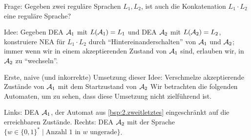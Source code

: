 Frage: Gegeben zwei reguläre Sprachen $L_1, L_2$, ist auch die Konkatenation $L_1\cdot L_2$ eine reguläre Sprache?

Idee: Gegeben \acs*{DEA} $\mathcal{A}_1$ mit $L(\mathcal{A}_1)=L_1$ und \acs*{DEA} $\mathcal{A}_2$ mit $L(\mathcal{A}_2)=L_2$,
konstruiere \acs*{NEA} für $L_1\cdot L_2$ durch "`Hintereinanderschalten"' von $\mathcal{A}_1$ und $\mathcal{A}_2$;
immer wenn wir in einem akzeptierenden Zustand von $\mathcal{A}_1$ sind, erlauben wir, in $\mathcal{A}_2$ zu "`wechseln"'.

Erste, naive (und inkorrekte) Umsetzung dieser Idee: 
Verschmelze akzeptierende Zustände von $\mathcal{A}_1$ mit dem Startzustand von $\mathcal{A}_2$
Wir betrachten die folgenden Automaten, um zu sehen, dass diese Umsetzung nicht zielführend ist.
\begin{Bsp}\label{bsp:2.naiveconcat}
Links: \acs*{DEA} $\mathcal{A}_1$, der Automat aus \autoref{bsp:2.zweitletztes} eingeschränkt auf die erreichbaren Zustände. Rechts: \acs*{DEA} $\mathcal{A}_2$ mit der Sprache $\{w\in\{0,1\}^*\mid \text{Anzahl $1$ in $w$ ungerade}\}$.
  \begin{center}

\end{center}
\end{Bsp}
